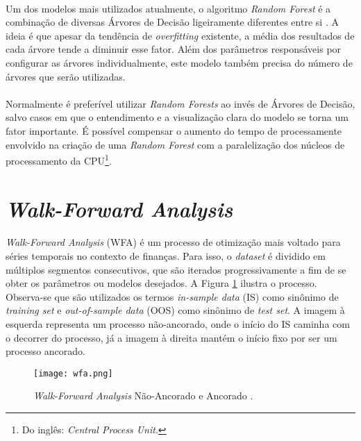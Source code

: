 \paragraph{} Um dos modelos mais utilizados atualmente, o algoritmo \textit{Random Forest} é a combinação de diversas Árvores de Decisão ligeiramente diferentes entre si \cite{muller2016introduction}. A ideia é que apesar da tendência de \textit{overfitting} existente, a média dos resultados de cada árvore tende a diminuir esse fator. Além dos parâmetros responsáveis por configurar as árvores individualmente, este modelo também precisa do número de árvores que serão utilizadas.

\paragraph{} Normalmente é preferível utilizar \textit{Random Forests} ao invés de Árvores de Decisão, salvo casos em que o entendimento e a visualização clara do modelo se torna um fator importante. É possível compensar o aumento do tempo de processamente envolvido na criação de uma \textit{Random Forest} com a paralelização dos núcleos de processamento da CPU\footnote{Do inglês: \textit{Central Process Unit}.}.



\FloatBarrier
\section{\textit{Walk-Forward Analysis}}

\paragraph{} \textit{Walk-Forward Analysis} (WFA) \cite{pardo2011evaluation} é um processo de otimização mais voltado para séries temporais no contexto de finanças. Para isso, o \textit{dataset} é dividido em múltiplos segmentos consecutivos, que são iterados progressivamente a fim de se obter os parâmetros ou modelos desejados. A Figura \ref{fig:10} ilustra o processo. Observa-se que são utilizados os termos \textit{in-sample data} (IS) como sinônimo de \textit{training set} e \textit{out-of-sample data} (OOS) como sinônimo de \textit{test set}. A imagem à esquerda representa um processo não-ancorado, onde o início do IS caminha com o decorrer do processo, já a imagem à direita mantém o início fixo por ser um processo ancorado.

\begin{figure}[h]
    \texttt{[image: wfa.png]}
    \centering
    \caption{\textit{Walk-Forward Analysis} Não-Ancorado e Ancorado \cite{wfo}.}
    \label{fig:10}
\end{figure}

